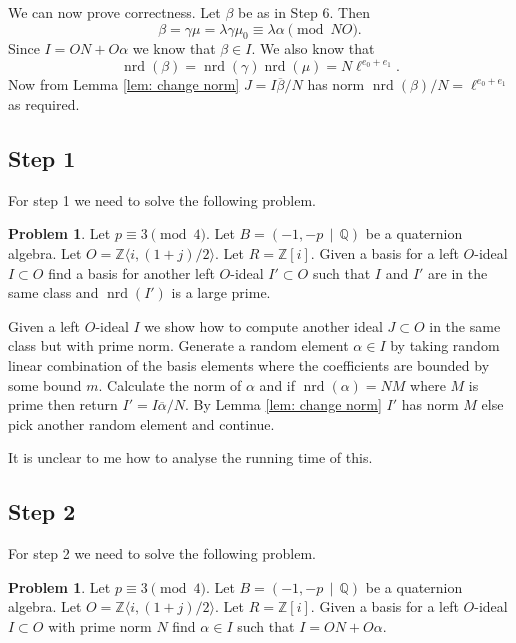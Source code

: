 \documentclass[10pt]{article}
\theoremstyle{plain}
\theoremstyle{definition}
\newtheorem{prob}[theorem]{Problem}
\newcommand{\op}{\operatorname}
\newcommand{\Z}{\mathbb{Z}}
\newcommand{\Q}{\mathbb{Q}}
\newcommand{\nrd}{\op{nrd}}
\begin{document}
We can now prove correctness.
Let \( \beta \) be as in Step 6.
Then
\[
    \beta = \gamma \mu = \lambda\gamma\mu_0 \equiv \lambda \alpha \pmod{NO}.
\]
Since \( I = ON + O \alpha \) we know that \( \beta \in I \).
We also know that
\[
    \nrd(\beta) = \nrd(\gamma) \nrd(\mu) = N\ell^{e_0 + e_1} .
\]
Now from Lemma \ref{lem: change norm} \( J = I\overline{\beta}/N \) has norm \( \nrd(\beta) / N = \ell^{e_0 + e_1} \) as required.

\subsection{Step 1}
For step 1 we need to solve the following problem.

\begin{prob}
    Let \( p \equiv 3 \pmod{4} \).
    Let \( B =  (-1, -p \, \mid \, \Q) \) be a quaternion algebra.
    Let \( O = \Z \langle i, (1+j) / 2 \rangle \).
    Let \( R = \Z[i] \).
    Given a basis for a left \( O \)-ideal \( I \subset O \) find a basis for another left \( O \)-ideal \( I' \subset O \) such that \( I \) and \( I' \) are in the same class and \( \nrd(I') \) is a large prime.
\end{prob}

Given a left \( O \)-ideal \( I \) we show how to compute another ideal \( J \subset O \) in the same class but with prime norm.
Generate a random element \( \alpha \in I \) by taking random linear combination of the basis elements where the coefficients are bounded by some bound \( m \).
Calculate the norm of \( \alpha \) and if \( \nrd(\alpha) = NM \) where \( M \) is prime then return \( I' = I \overline{\alpha} / N \).
By Lemma \ref{lem: change norm} \( I' \) has norm \( M \) else pick another random element and continue.

{\color{red} It is unclear to me how to analyse the running time of this.}


\subsection{Step 2}
For step 2 we need to solve the following problem.

\begin{prob} \label{prob: I = ON + Oalpha}
    Let \( p \equiv 3 \pmod{4} \).
    Let \( B =  (-1, -p \, \mid \, \Q) \) be a quaternion algebra.
    Let \( O = \Z \langle i, (1+j) / 2 \rangle \).
    Let \( R = \Z[i] \).
    Given a basis for a left \( O \)-ideal \( I \subset O \) with prime norm \( N \) find \( \alpha \in I \) such that \( I = ON + O\alpha \).
\end{prob}
\end{document}
